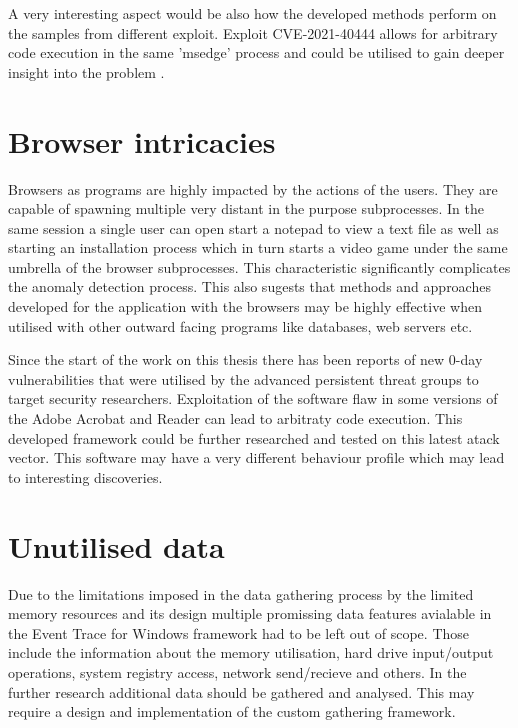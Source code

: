 \documentclass[a4paper,twoside,12pt]{book}
\begin{document}
A very interesting aspect would be also how the developed methods perform on the samples from 
different exploit. Exploit CVE-2021-40444 allows for arbitrary code execution in the same 'msedge'
process and could be utilised to gain deeper insight into the problem \cite{bib:newEdgeExploit}.

\section{Browser intricacies}

Browsers as programs are highly impacted by the actions of the users. They are capable of spawning
multiple very distant in the purpose subprocesses. In the same session a single user can open start
a notepad to view a text file as well as starting an installation process which in turn starts a 
video game under the same umbrella of the browser subprocesses. This characteristic significantly
complicates the anomaly detection process. This also sugests that methods and approaches developed
for the application with the browsers may be highly effective when utilised with other outward 
facing programs like databases, web servers etc.

Since the start of the work on this thesis there has been reports of new 0-day vulnerabilities that were
utilised by the advanced persistent threat groups to target security researchers. Exploitation of the
software flaw in some versions of the Adobe Acrobat and Reader can lead to arbitraty code execution\cite{bib:AdobeExploit}.
This developed framework could be further researched and tested on this latest atack vector. This 
software may have a very different behaviour profile which may lead to interesting discoveries.

\section{Unutilised data}

Due to the limitations imposed in the data gathering process by the limited memory resources and its
design multiple promissing data features avialable in the Event Trace for Windows framework had to be
left out of scope. Those include the information about the memory utilisation, hard drive input/output 
operations, system registry access, network send/recieve and others. In the further research additional 
data should be gathered and analysed. This may require a design and implementation of the custom  
gathering framework.
\end{document}
